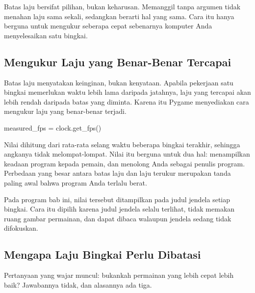 \begin{catatabox}
Batas laju bersifat pilihan, bukan keharusan. Memanggil
 tanpa argumen tidak menahan laju sama sekali, sedangkan
 berarti hal yang sama. Cara itu hanya berguna untuk
mengukur seberapa cepat sebenarnya komputer Anda menyelesaikan satu bingkai.
\end{catatabox}

\subsection{Mengukur Laju yang Benar-Benar Tercapai}

Batas laju menyatakan keinginan, bukan kenyataan. Apabila pekerjaan satu
bingkai memerlukan waktu lebih lama daripada jatahnya, laju yang tercapai
akan lebih rendah daripada batas yang diminta. Karena itu Pygame menyediakan
cara mengukur laju yang benar-benar terjadi.

\begin{kodekeluaran}
measured_fps = clock.get_fps()
\end{kodekeluaran}

Nilai  dihitung dari rata-rata selang waktu beberapa
bingkai terakhir, sehingga angkanya tidak melompat-lompat. Nilai itu berguna
untuk dua hal: menampilkan keadaan program kepada pemain, dan menolong Anda
sebagai penulis program. Perbedaan yang besar antara batas laju dan laju
terukur merupakan tanda paling awal bahwa program Anda terlalu berat.

Pada program bab ini, nilai tersebut ditampilkan pada judul jendela setiap
bingkai. Cara itu dipilih karena judul jendela selalu terlihat, tidak
memakan ruang gambar permainan, dan dapat dibaca walaupun jendela sedang
tidak difokuskan.

\subsection{Mengapa Laju Bingkai Perlu Dibatasi}

Pertanyaan yang wajar muncul: bukankah permainan yang lebih cepat lebih baik?
Jawabannya tidak, dan alasannya ada tiga.

